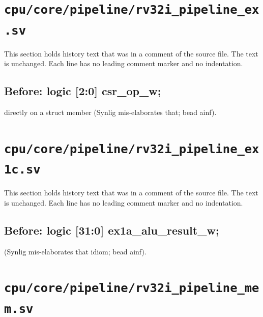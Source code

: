 \section{\texttt{cpu/core/pipeline/rv32i\_pipeline\_ex.sv}}\label{cr:mod:rv32i-pipeline-ex}

This section holds history text that was in a comment of the source file. The text is unchanged. Each line has no leading comment marker and no indentation.

\begin{record}

\subsection*{Before: logic [2:0]  csr\_op\_w;}

\begin{textblock}
directly on a struct member (Synlig mis-elaborates that; bead ainf).
\end{textblock}

\end{record}

\section{\texttt{cpu/core/pipeline/rv32i\_pipeline\_ex1c.sv}}\label{cr:mod:rv32i-pipeline-ex1c}

This section holds history text that was in a comment of the source file. The text is unchanged. Each line has no leading comment marker and no indentation.

\begin{record}

\subsection*{Before: logic [31:0] ex1a\_alu\_result\_w;}

\begin{textblock}
(Synlig mis-elaborates that idiom; bead ainf).
\end{textblock}

\end{record}

\section{\texttt{cpu/core/pipeline/rv32i\_pipeline\_mem.sv}}\label{cr:mod:rv32i-pipeline-mem}


